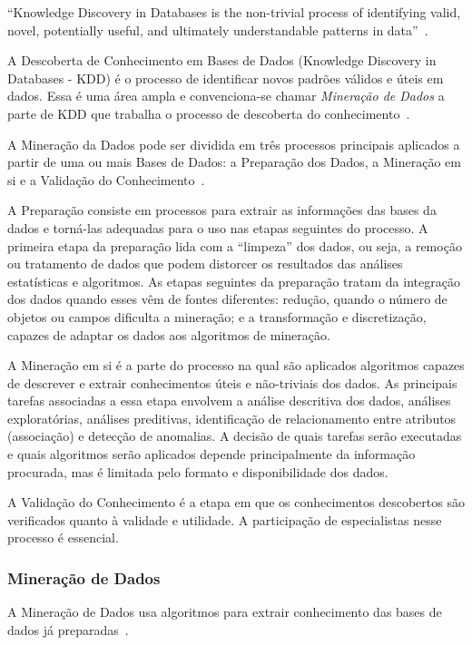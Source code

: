 \documentclass[12pt,a4paper]{article}
\begin{document}
\enquote{Knowledge Discovery in Databases is the non-trivial process of identifying valid, novel, potentially useful, and ultimately understandable patterns in data}~\cite{Fayyad1996-yz}.

A Descoberta de Conhecimento em Bases de Dados (Knowledge Discovery in Databases - KDD) é o processo de identificar novos padrões válidos e úteis em dados. Essa é uma área ampla e convenciona-se chamar \textit{Mineração de Dados} a parte de KDD que trabalha o processo de descoberta do conhecimento~\cite{Nunes2016}.

A Mineração da Dados pode ser dividida em três processos principais aplicados a partir de uma ou mais Bases de Dados: a Preparação dos Dados, a Mineração em si e a Validação do Conhecimento~\cite{Nunes2016}.

A Preparação consiste em processos para extrair as informações das bases da dados e torná-las adequadas para o uso nas etapas seguintes do processo. A primeira etapa da preparação lida com a \enquote{limpeza} dos dados, ou seja, a remoção ou tratamento de dados que podem distorcer os resultados das análises estatísticas e algoritmos. As etapas seguintes da preparação tratam da integração dos dados quando esses vêm de fontes diferentes: redução, quando o número de objetos ou campos dificulta a mineração; e a transformação e discretização, capazes de adaptar os dados aos algoritmos de mineração.

A Mineração em si é a parte do processo na qual são aplicados algoritmos capazes de descrever e extrair conhecimentos úteis e não-triviais dos dados. As principais tarefas associadas a essa etapa envolvem a análise descritiva dos dados, análises exploratórias, análises preditivas, identificação de relacionamento entre atributos (associação) e detecção de anomalias. A decisão de quais tarefas serão executadas e quais algoritmos serão aplicados depende principalmente da informação procurada, mas é limitada pelo formato e disponibilidade dos dados.

A Validação do Conhecimento é a etapa em que os conhecimentos descobertos são verificados quanto à validade e utilidade. A participação de especialistas nesse processo é essencial.

\subsubsection{Mineração de Dados}

A Mineração de Dados usa algoritmos para extrair conhecimento das bases de dados já preparadas~\cite{Nunes2016}.
\end{document}
